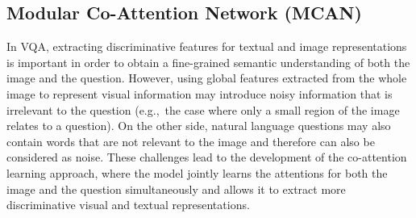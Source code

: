 \documentclass{article}
\begin{document}
\subsection{Modular Co-Attention Network (MCAN)} \label{subsection:mcan}
In VQA, extracting discriminative features for textual and image representations is important in order to obtain a fine-grained semantic understanding of both the image and the question. However, using global features extracted from the whole image to represent visual information may introduce noisy information that is irrelevant to the question (e.g.,\ the case where only a small region of the image relates to a question). On the other side, natural language questions may also contain words that are not relevant to the image and therefore can also be considered as noise. These challenges lead to the development of the co-attention learning approach, where the model jointly learns the attentions for both the image and the question simultaneously and allows it to extract more discriminative visual and textual representations. 

\end{document}
